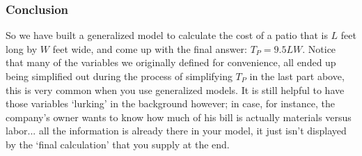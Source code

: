 {\begin{itemize}
\end{itemize}


\subsubsection*{Conclusion}

So we have built a generalized model to calculate the cost of a patio that is $L$ feet long by $W$ feet wide, and come up with the final answer: $T_P = 9.5LW$. Notice that many of the variables we originally defined for convenience, all ended up being simplified out during the process of simplifying $T_P$ in the last part above, this is very common when you use generalized models. It is still helpful to have those variables `lurking' in the background however; in case, for instance, the company's owner wants to know how much of his bill is actually materials versus labor... all the information is already there in your model, it just isn't displayed by the `final calculation' that you supply at the end.


    }%


